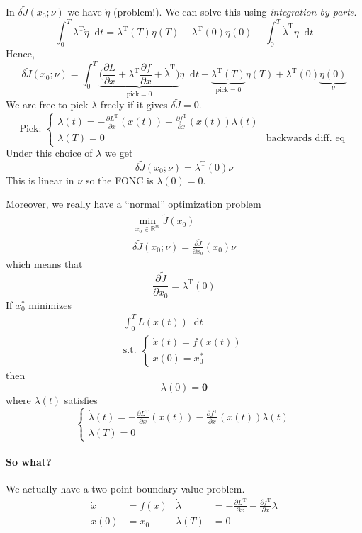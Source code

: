 \documentclass[letterpaper,12pt,titlepage]{report}
\newcommand*\dif{\mathop{}\!\mathrm{d}}
\newcommand{\trans}{^\text{T}}
\newcommand*\pder[2]{\frac{\partial #1}{\partial #2}}
\newcommand*\R{\mathbb{R}}
\theoremstyle{plain}
\theoremstyle{definition}
\begin{document}
In $\delta\tilde J(x_0;\nu)$ we have $\dot\eta$ (problem!). We can solve this using \emph{integration by parts}.
\[ \int_0^T \lambda\trans \dot\eta \dif t = \lambda\trans(T)\eta(T) - \lambda\trans(0)\eta(0) - \int_0^T \dot\lambda\trans\eta \dif t \]
Hence,
\[
  \delta\tilde J(x_0;\nu) = \int_0^T \underbrace{\big( \pder{L}{x} + \lambda\trans\pder{f}{x} + \dot\lambda\trans \big)}_{\text{pick}=0} \eta \dif t - \underbrace{\lambda\trans(T)}_{\text{pick}=0} \eta(T) + \lambda\trans(0) \underbrace{\eta(0)}_{\nu}
\]
We are free to pick $\lambda$ freely if it gives $\delta\tilde J=0$.
\[ \text{Pick: } \begin{cases}
    \dot\lambda(t) = -\pder{L\trans}{x}(x(t)) - \pder{f\trans}{x}(x(t)) \lambda(t) \\
    \lambda(T) = 0 & \text{backwards diff. eq}
  \end{cases} \]
Under this choice of $\lambda$ we get
\[ \delta\tilde J(x_0;\nu) = \lambda\trans(0) \nu \]
This is linear in $\nu$ so the FONC is $\lambda(0)=0$.

Moreover, we really have a ``normal'' optimization problem
\begin{gather}
  \min_{x_0\in\R^m} \tilde J(x_0) \\
  \delta \tilde J(x_0;\nu) = \pder{\tilde J}{x_0} (x_0) \nu
\end{gather}
which means that
\[ \pder{\tilde J}{x_0} = \lambda\trans(0) \]
If $x_0^*$ minimizes
\begin{gather}
  \int_0^T L(x(t)) \dif t \\
  \text{s.t. } \begin{cases}
    \dot x(t) = f(x(t)) \\
    x(0) = x_0^*
  \end{cases}
\end{gather}
then
\[ \lambda(0) = \bm 0 \]
where $\lambda(t)$ satisfies
\[ \begin{cases}
    \dot \lambda(t) = -\pder{L\trans}{x}(x(t)) - \pder{f\trans}{x}(x(t)) \lambda(t) \\
    \lambda(T) = 0
  \end{cases} \]

\paragraph{So what?} We actually have a two-point boundary value problem. 
\begin{align}
  \dot x &= f(x) & \dot\lambda &= -\pder{L\trans}{x} - \pder{f\trans}{x} \lambda \\
  x(0) &= x_0 & \lambda(T) &= 0
\end{align}
\end{document}
